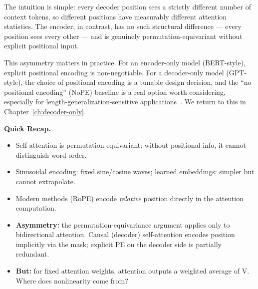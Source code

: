 \medskip
\noindent{}
\medskip

The intuition is simple: every decoder position sees a strictly different number of context tokens, so different positions have measurably different attention statistics. The encoder, in contrast, has no such structural difference --- every position sees every other --- and is genuinely permutation-equivariant without explicit positional input.

This asymmetry matters in practice. For an encoder-only model (BERT-style), explicit positional encoding is non-negotiable. For a decoder-only model (GPT-style), the choice of positional encoding is a tunable design decision, and the ``no positional encoding'' (NoPE) baseline is a real option worth considering, especially for length-generalization-sensitive applications~\cite{kazemnejad2023impact}. We return to this in Chapter~\ref{ch:decoder-only}.

\begin{quickrecap}
\textbf{Quick Recap.}
\begin{itemize}[nosep,leftmargin=1.5em]
  \item Self-attention is permutation-equivariant: without positional info, it cannot distinguish word order.
  \item Sinusoidal encoding: fixed sine/cosine waves; learned embeddings: simpler but cannot extrapolate.
  \item Modern methods (RoPE) encode \emph{relative} position directly in the attention computation.
  \item \textbf{Asymmetry:} the permutation-equivariance argument applies only to bidirectional attention. Causal (decoder) self-attention encodes position implicitly via the mask; explicit PE on the decoder side is partially redundant.
  \item \textbf{But:} for fixed attention weights, attention outputs a weighted average of V. Where does nonlinearity come from?
\end{itemize}
\end{quickrecap}


